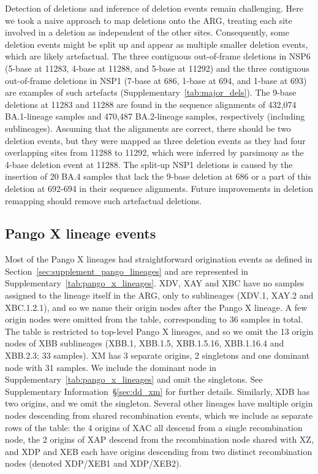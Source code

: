 \documentclass[12pt]{article}
\newcommand{\supref}[1]{Supplementary Information~\S\ref{#1}}
\newcommand{\siref}[1]{Supplementary~\ref{#1}}
\begin{document}
Detection of deletions and inference of deletion events
remain challenging.
Here we took a naive approach to map deletions onto the ARG,
treating each site involved in a deletion
as independent of the other sites.
Consequently, some deletion events might be split up and
appear as multiple smaller deletion events,
which are likely artefactual.
The three contiguous out-of-frame deletions in NSP6
(5-base at 11283, 4-base at 11288, and 5-base at 11292) and
the three contiguous out-of-frame deletions in NSP1
(7-base at 686, 1-base at 694, and 1-base at 693)
are examples of such artefacts (\siref{tab:major_dels}).
The 9-base deletions at 11283 and 11288
are found in the sequence alignments of
432,074 BA.1-lineage samples and 470,487 BA.2-lineage samples,
respectively (including sublineages).
Assuming that the alignments are correct,
there should be two deletion events,
but they were mapped as three deletion events
as they had four overlapping sites from 11288 to 11292,
which were inferred by parsimony
as the 4-base deletion event at 11288.
The split-up NSP1 deletions is caused by
the insertion of 20 BA.4 samples
that lack the 9-base deletion at 686 or
a part of this deletion at 692-694
in their sequence alignments.
Future improvements in deletion remapping
should remove such artefactual deletions.


\subsection{Pango X lineage events}
\label{sec:supplement_x_pango_lineages}

Most of the Pango X lineages had straightforward origination events
as defined in Section~\ref{sec:supplement_pango_lineages}
and are represented in \siref{tab:pango_x_lineages}.
XDV, XAY and XBC have no samples assigned to the lineage itself in the ARG,
only to sublineages (XDV.1, XAY.2 and XBC.1.2.1),
and so we name their origin nodes after the Pango X lineage.
A few origin nodes were omitted from the table,
corresponding to 36 samples in total.
The table is restricted to top-level Pango X lineages,
and so we omit the 13 origin nodes of XBB sublineages
(XBB.1, XBB.1.5, XBB.1.5.16, XBB.1.16.4 and XBB.2.3; 33 samples).
XM has 3 separate origins, 2 singletons and one dominant node
with 31 samples. We include the dominant node in
\siref{tab:pango_x_lineages} and omit the singletons. See
\supref{sec:dd_xm} for further details.
Similarly, XDB has two origins, and we omit the singleton.
Several other lineages have multiple origin nodes descending from shared
recombination events, which we include as separate rows of the table:
the 4 origins of XAC all descend from a single recombination node,
the 2 origins of XAP descend from the recombination node shared with XZ,
and XDP and XEB each have origins descending from two distinct
recombination nodes (denoted XDP/XEB1 and XDP/XEB2).
\end{document}
